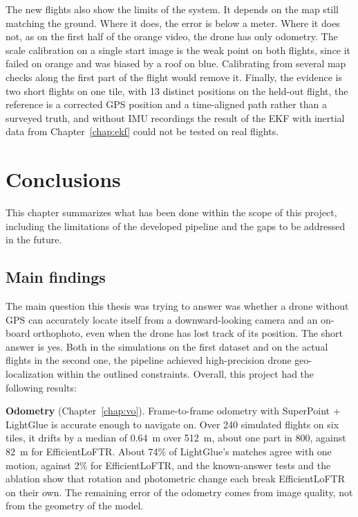 \documentclass[english, Lau, oneside]{sapthesis}%
\begin{document}
The new flights also show the limits of the system. It depends on the map still matching the ground. Where it does, the error is below a meter. Where it does not, as on the first half of the orange video, the drone has only odometry. The scale calibration on a single start image is the weak point on both flights, since it failed on orange and was biased by a roof on blue. Calibrating from several map checks along the first part of the flight would remove it. Finally, the evidence is two short flights on one tile, with 13 distinct positions on the held-out flight, the reference is a corrected GPS position and a time-aligned path rather than a surveyed truth, and without IMU recordings the result of the EKF with inertial data from Chapter~\ref{chap:ekf} could not be tested on real flights.

\chapter{Conclusions}
\label{chap:conclusions}
This chapter summarizes what has been done within the scope of this project, including the limitations of the developed pipeline and the gaps to be addressed in the future.

\section{Main findings}
\label{sec:findings}
The main question this thesis was trying to answer was whether a drone without GPS can accurately locate itself from a downward-looking camera and an on-board orthophoto, even when the drone has lost track of its position. The short answer is yes. Both in the simulations on the first dataset and on the actual flights in the second one, the pipeline achieved high-precision drone geo-localization within the outlined constraints. Overall, this project had the following results:

\textbf{Odometry} (Chapter~\ref{chap:vo}). Frame-to-frame odometry with SuperPoint + LightGlue is accurate enough to navigate on. Over 240 simulated flights on six tiles, it drifts by a median of 0.64~m over 512~m, about one part in 800, against 82~m for EfficientLoFTR. About 74\% of LightGlue's matches agree with one motion, against 2\% for EfficientLoFTR, and the known-answer tests and the ablation show that rotation and photometric change each break EfficientLoFTR on their own. The remaining error of the odometry comes from image quality, not from the geometry of the model.
\end{document}
